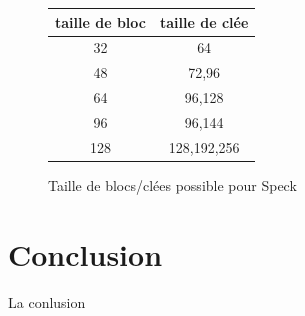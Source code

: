 			\vspace{0.5cm}

			\begin{figure}[!h]
				\centering
				\begin{tabular}{cc}
					taille de bloc & taille de clée \\
					\hline
					32 & 64 \\
					\hline
					48 & 72,96 \\
					\hline
					64 & 96,128 \\
					\hline
					96 & 96,144 \\
					\hline
					128 & 128,192,256 \\
					\hline
				\end{tabular}
				\caption{Taille de blocs/clées possible pour Speck}
			 	\label{tailleSpeck}
			\end{figure}

			\vspace{0.5cm}



\newpage
\part*{Conclusion}

		La conlusion
